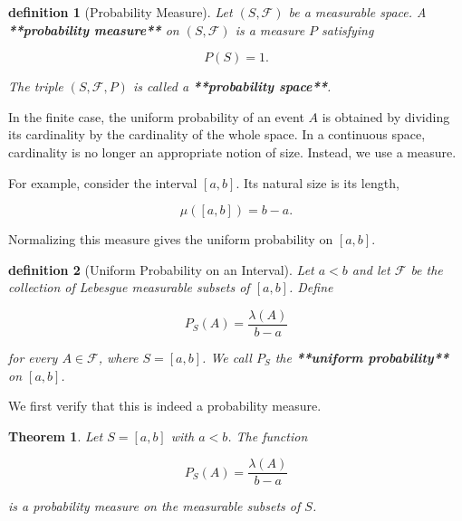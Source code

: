 \documentclass[10pt,a4paper]{book}
\newtheorem{definition}{definition}[section]
\newtheorem{theorem}{Theorem}[section]
\begin{document}
\begin{definition}[Probability Measure]

    Let $(S,\mathcal{F})$ be a measurable space. A \textbf{**probability measure**} on $(S,\mathcal{F})$ is a measure $P$ satisfying

    $$
        P(S)=1.
    $$

    The triple $(S,\mathcal{F},P)$ is called a \textbf{**probability space**}.
\end{definition}

In the finite case, the uniform probability of an event $A$ is obtained by dividing its cardinality by the cardinality of the whole space. In a continuous space, cardinality is no longer an appropriate notion of size. Instead, we use a measure.

For example, consider the interval $[a,b]$. Its natural size is its length,

$$
    \mu([a,b])=b-a.
$$

Normalizing this measure gives the uniform probability on $[a,b]$.

\begin{definition}[Uniform Probability on an Interval]

    Let $a<b$ and let $\mathcal F$ be the collection of Lebesgue measurable subsets of $[a,b]$. Define

    $$
        P_S(A)=\frac{\lambda(A)}{b-a}
    $$

    for every $A\in\mathcal F$, where $S=[a,b]$. We call $P_S$ the \textbf{**uniform probability**} on $[a,b]$.
\end{definition}

We first verify that this is indeed a probability measure.

\begin{theorem}

    Let $S=[a,b]$ with $a<b$. The function

    $$
        P_S(A)=\frac{\lambda(A)}{b-a}
    $$

    is a probability measure on the measurable subsets of $S$.

\end{theorem}
\end{document}

